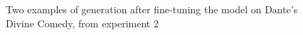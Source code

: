 \documentclass[10pt,twocolumn,letterpaper]{article}
\begin{document}
\begin{figure}[ht]
\begin{subfigure}{.5\linewidth}
  \label{fig:sub1}
\end{subfigure}%
\caption{Two examples of generation after fine-tuning the model on Dante's Divine Comedy, from experiment 2}
\label{fig:test}
\end{figure}
\end{document}
